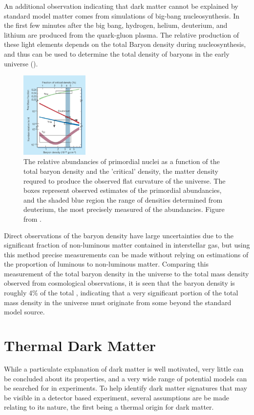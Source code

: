 An additional observation indicating that dark matter cannot be explained by standard model matter comes from simulations of big-bang nucleosynthesis. 
In the first few minutes after the big bang, hydrogen, helium, deuterium, and lithium are produced from the quark-gluon plasma. 
The relative production of these light elements depends on the total Baryon density during nucleosynthesis, and thus can be used to determine the total density of baryons in the early universe ().

\begin{figure}[htpb]
	\label{fig:baryogenesis}
	\centering
	\includegraphics[width=0.3\textwidth]{figures/baryogenesis.png}
	\caption[Relative Light Baryon Abundancies]{The relative abundancies of primordial nuclei as a function of the total baryon density and the 'critical' density, the matter density requred to produce the observed flat curvature of the universe. The boxes represent observed estimates of the primordial abundancies, and the shaded blue region the range of densities determined from deuterium, the most precisely measured of the abundancies. Figure from \cite{charbonnel2002}.}
\end{figure}

Direct observations of the baryon density have large uncertainties due to the significant fraction of non-luminous matter contained in interstellar gas, but using this method precise measurements can be made without relying on estimations of the proportion of luminous to non-luminous matter.
Comparing this measurement of the total baryon density in the universe to the total mass density observed from cosmological observations, it is seen that the baryon density is roughly 4\% of the total \cite{Tytler_2000}, indicating that a very significant portion of the total mass density in the universe must originate from some beyond the standard model source.

\section{Thermal Dark Matter}
While a particulate explanation of dark matter is well motivated, very little can be concluded about its properties, and a very wide range of potential models can be searched for in experiments.
To help identify dark matter signatures that may be visible in a detector based experiment, several assumptions are be made relating to its nature, the first being a thermal origin for dark matter.

